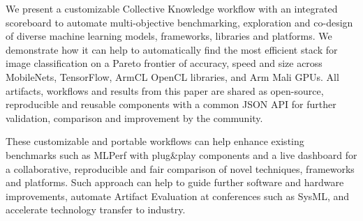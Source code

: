 We present a customizable Collective Knowledge workflow with
an integrated scoreboard to automate multi-objective benchmarking,
exploration and co-design of diverse machine learning models,
frameworks, libraries and platforms.
%
We demonstrate how it can help to automatically find 
the most efficient stack for image classification 
on a Pareto frontier of accuracy, speed and size 
across MobileNets, TensorFlow, ArmCL OpenCL libraries,
and Arm Mali GPUs.
%
All artifacts, workflows and results from this paper
are shared as open-source, reproducible and reusable components
with a common JSON API for further validation, comparison
and improvement by the community.

These customizable and portable workflows can help enhance 
existing benchmarks such as MLPerf with plug\&play components 
and a live dashboard for a collaborative, reproducible and 
fair comparison of novel techniques, frameworks and platforms.
%
Such approach can help to guide further software and hardware improvements, 
automate Artifact Evaluation at conferences such as SysML, 
and accelerate technology transfer to industry.
